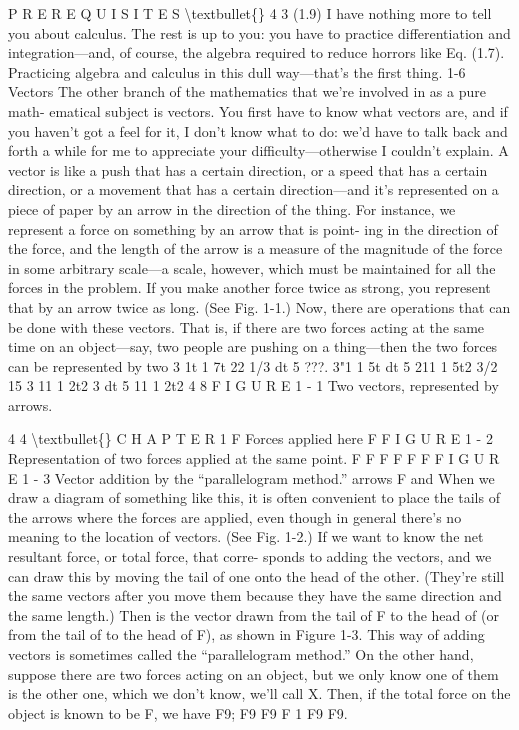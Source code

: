 \documentclass[10pt,oneside]{article}
\begin{document}
P R E R E Q U I S I T E S \textbackslash{}textbullet\{\} 4 3 (1.9) I have nothing more to tell you about calculus. The rest is up to you: you have to practice differentiation and integration---and, of course, the algebra required to reduce horrors like Eq. (1.7). Practicing algebra and calculus in this dull way---that’s the first thing. 1-6 Vectors The other branch of the mathematics that we’re involved in as a pure math- ematical subject is vectors. You first have to know what vectors are, and if you haven’t got a feel for it, I don’t know what to do: we’d have to talk back and forth a while for me to appreciate your difficulty---otherwise I couldn’t explain. A vector is like a push that has a certain direction, or a speed that has a certain direction, or a movement that has a certain direction---and it’s represented on a piece of paper by an arrow in the direction of the thing. For instance, we represent a force on something by an arrow that is point- ing in the direction of the force, and the length of the arrow is a measure of the magnitude of the force in some arbitrary scale---a scale, however, which must be maintained for all the forces in the problem. If you make another force twice as strong, you represent that by an arrow twice as long. (See Fig. 1-1.) Now, there are operations that can be done with these vectors. That is, if there are two forces acting at the same time on an object---say, two people are pushing on a thing---then the two forces can be represented by two 3 1t 1 7t 22 1/3 dt 5 ???. 3"1 1 5t dt 5 211 1 5t2 3/2 15 3 11 1 2t2 3 dt 5 11 1 2t2 4 8 F I G U R E 1 - 1 Two vectors, represented by arrows.\par

4 4 \textbackslash{}textbullet\{\} C H A P T E R  1 F Forces applied here F F I G U R E 1 - 2 Representation of two forces applied at the same point. F F F  F F F F I G U R E 1 - 3 Vector addition by the “parallelogram method.” arrows F and When we draw a diagram of something like this, it is often convenient to place the tails of the arrows where the forces are applied, even though in general there’s no meaning to the location of vectors. (See Fig. 1-2.) If we want to know the net resultant force, or total force, that corre- sponds to adding the vectors, and we can draw this by moving the tail of one onto the head of the other. (They’re still the same vectors after you move them because they have the same direction and the same length.) Then is the vector drawn from the tail of F to the head of (or from the tail of to the head of F), as shown in Figure 1-3. This way of adding vectors is sometimes called the “parallelogram method.” On the other hand, suppose there are two forces acting on an object, but we only know one of them is the other one, which we don’t know, we’ll call X. Then, if the total force on the object is known to be F, we have F9; F9 F9 F 1 F9 F9.\par
\end{document}
